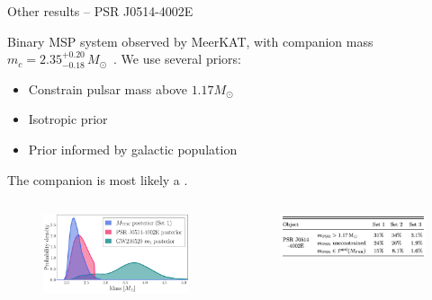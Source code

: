 \documentclass[usenames,dvipsnames,t]{beamer}
\begin{document}
\begin{frame}{Other results -- PSR J0514-4002E}

  \def\x{3mm}

  Binary MSP system observed by MeerKAT, with companion mass $m_c = 2.35^{+0.20}_{-0.18} \, M_\odot$~\cite{Barr:2024wwl}. We use several priors:
  \begin{itemize}

    \vspace{\x}
    \item Constrain pulsar mass above $1.17 M_\odot$

    \vspace{\x}

    \item Isotropic prior

    \vspace{\x}

    \item Prior informed by galactic population
  \end{itemize}

  \vspace{\x}

  The companion is most likely a .

  \begin{columns}
    
  
  \begin{figure}
    \centering
    \includegraphics[width=0.9\linewidth]{Figures/masses_set_L1.pdf}
  \end{figure}


  \begin{figure}
    \centering
    \includegraphics[width=0.9\linewidth]{Figures/PSR_Barr_results.jpg}
  \end{figure}


\end{columns}
\end{frame}
\end{document}
